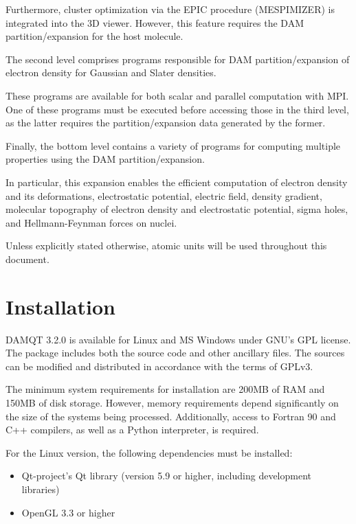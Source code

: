 \documentclass[10pt]{article}
\begin{document}
Furthermore, cluster optimization via the EPIC procedure (MESPIMIZER) is integrated into the 3D viewer. However, this feature requires the DAM partition/expansion for the host molecule. 

The second level comprises programs responsible for DAM partition/expansion of electron density for Gaussian and Slater densities.

These programs are available for both scalar and parallel computation with MPI.
One of these programs must be executed before accessing those in the third level, as the latter requires the partition/expansion data generated by the former. 

Finally, the bottom level contains a variety of programs for computing multiple properties using the DAM partition/expansion. 

In particular, this expansion enables the efficient computation of electron density and its deformations, electrostatic potential, electric field, density gradient,
molecular topography of electron density and electrostatic potential, sigma holes, and Hellmann-Feynman forces on nuclei.

Unless explicitly stated otherwise, atomic units will be used throughout this document.

\newpage

\section{Installation \label{sec:1}}

DAMQT 3.2.0 is available for Linux and MS Windows under GNU's GPL license.
The package includes both the source code and other ancillary files.
The sources can be modified and distributed in accordance with the terms of GPLv3.

The minimum system requirements for installation are 200MB of RAM and 150MB of disk storage.
However, memory requirements depend significantly on the size of the systems being processed.
Additionally, access to Fortran 90 and C++ compilers, as well as a Python interpreter, is required.

For the Linux version, the following dependencies must be installed:
\begin{itemize}
\item Qt-project's Qt library (version 5.9 or higher, including development libraries)
\item OpenGL 3.3 or higher
\end{itemize}
\end{document}
